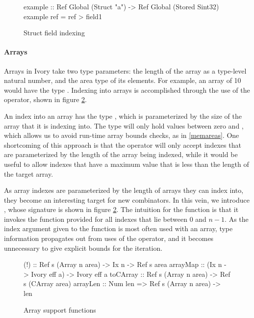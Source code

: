 \begin{figure}[h]
\begin{code}
example :: Ref Global (Struct "a")
        -> Ref Global (Stored Sint32)
example ref = ref \mytilde> field1
\end{code}
\caption{Struct field indexing}
\label{example-struct-label}
\end{figure}

\paragraph{Arrays}
Arrays in Ivory take two type parameters: the length of the array as a
type-level natural number, and the area type of its elements.  For example, an
array of 10  would have the type .  Indexing into arrays is accomplished through the use of the \cd{(!)}
operator, shown in figure \ref{array-support-functions}.

An index into an array has the type , which is parameterized by the size
of the array that it is indexing into.  The  type will only hold
values between zero and , which allows us to avoid run-time array bounds
checks, as in \ref{memareas}.  One shortcoming of this approach is that the
\cd{(!)} operator will only accept indexes that are parameterized by the length
of the array being indexed, while it would be useful to allow indexes that have
a maximum value that is less than the length of the target array.

As array indexes are parameterized by the length of arrays they can index into,
they become an interesting target for new combinators.  In this vein, we
introduce , whose signature is shown in figure
\ref{array-support-functions}.  The intuition for the  function is
that it invokes the function provided for all indexes that lie between $0$ and
$n - 1$.  As the index argument given to the function is most often used with an
array, type information propagates out from uses of the \cd{(!)} operator, and
it becomes unnecessary to give explicit bounds for the iteration.

\begin{figure}[h]
\begin{code}
(!)      :: Ref s (Array n area) -> Ix n -> Ref s area
arrayMap :: (Ix n -> Ivory eff a) -> Ivory eff a
toCArray :: Ref s (Array n area) -> Ref s (CArray area)
arrayLen :: Num len => Ref s (Array n area) -> len
\end{code}
\caption{Array support functions}
\label{array-support-functions}
\end{figure}

